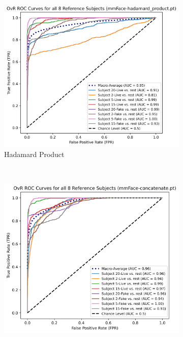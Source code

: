 \documentclass{mpaper}
\begin{document}
\begin{figure}[ht!]
    \centering
    \begin{subfigure}[b]{0.325\textwidth}
        \includegraphics[width=1.082\textwidth]{figures/roc_hadamard_product.png}
        \caption{Hadamard Product}
        \label{fig:roc_hadamard_product}
    \end{subfigure}
    ~\hspace{0.001cm}
    \begin{subfigure}[b]{0.315\textwidth}
        \includegraphics[width=1.065\textwidth]{figures/roc_concatenate.png}

\end{subfigure}
\end{figure}
\end{document}
